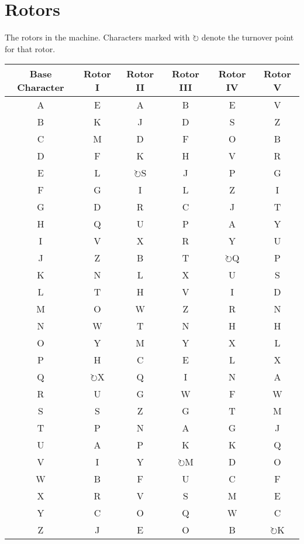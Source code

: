 \section{Rotors}

The rotors in the machine.  Characters marked with $\circlearrowright$ denote the turnover point for that rotor.

\begin{tabular}{|c||c|c|c|c|c|}
\hline
Base Character & Rotor I & Rotor II & Rotor III & Rotor IV & Rotor V\\\hline\hline
A & E & A & B & E & V\\\hline
B & K & J & D & S & Z\\\hline
C & M & D & F & O & B\\\hline
D & F & K & H & V & R\\\hline
E & L & $\circlearrowright$S & J & P & G\\\hline
F & G & I & L & Z & I\\\hline
G & D & R & C & J & T\\\hline
H & Q & U & P & A & Y\\\hline
I & V & X & R & Y & U\\\hline
J & Z & B & T & $\circlearrowright$Q & P\\\hline
K & N & L & X & U & S\\\hline
L & T & H & V & I & D\\\hline
M & O & W & Z & R & N\\\hline
N & W & T & N & H & H\\\hline
O & Y & M & Y & X & L\\\hline
P & H & C & E & L & X\\\hline
Q & $\circlearrowright$X & Q & I & N & A\\\hline
R & U & G & W & F & W\\\hline
S & S & Z & G & T & M\\\hline
T & P & N & A & G & J\\\hline
U & A & P & K & K & Q\\\hline
V & I & Y & $\circlearrowright$M & D & O\\\hline
W & B & F & U & C & F\\\hline
X & R & V & S & M & E\\\hline
Y & C & O & Q & W & C\\\hline
Z & J & E & O & B & $\circlearrowright$K\\\hline
\end{tabular}